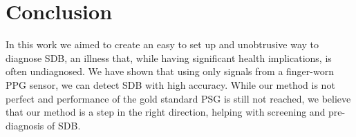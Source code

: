 \chapter{Conclusion \label{Chapter-Conclusion}}

In this work we aimed to create an easy to set up and unobtrusive way to diagnose SDB, an illness that, while having significant health implications, is often undiagnosed. We have shown that using only signals from a finger-worn PPG sensor, we can detect SDB with high accuracy. While our method is not perfect and performance of the gold standard PSG is still not reached, we believe that our method is a step in the right direction, helping with screening and pre-diagnosis of SDB.
